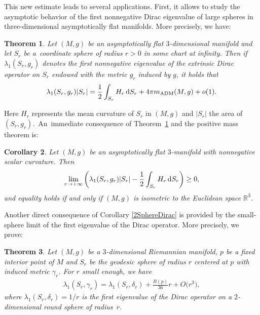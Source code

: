 \documentclass[pdftex]{sigma}
\numberwithin{equation}{section}
\newtheorem{Theorem}{Theorem}[section]
\newtheorem{Corollary}[Theorem]{Corollary}
\begin{document}
This new estimate leads to several applications. First, it allows to study the asymptotic behavior of the first nonnegative Dirac eigenvalue of large spheres in three-dimensional asymptotically flat manifolds. More precisely, we have:

\begin{Theorem}\label{AsymptoticDiracSphere}
Let $(M,g)$ be an asymptotically flat $3$-dimensional manifold and let $S_r$ be a~coordinate sphere of radius $r>0$ in some chart at infinity. Then if $\lambda_1(S_r,g_r)$ denotes the first nonnegative eigenvalue of the extrinsic Dirac operator on $S_r$ endowed with the metric $g_r$ induced by $g$, it holds that
\begin{gather}\label{IntegralInequality1}
\lambda_1(S_r,g_r)|S_r|=\frac{1}{2}\int_{S_r} H_r\,{\rm d}S_{r}+4\pi m_{\rm ADM}(M,g)+o(1).
\end{gather}
\end{Theorem}

Here $H_r$ represents the mean curvature of $S_r$ in $(M,g)$ and $|S_r|$ the area of $(S_r,g_r)$.\ An~im\-me\-di\-ate consequence of Theorem~\ref{AsymptoticDiracSphere} and the positive mass theorem is:

\begin{Corollary}%
Let $(M,g)$ be an asymptotically flat $3$-manifold with nonnegative scalar curvature. Then
\begin{gather*}
\lim_{r\rightarrow+\infty}\bigg(\lambda_1(S_r,g_r)|S_r|-\frac{1}{2}\int_{S_r} H_r\,{\rm d}S_{r}\bigg)\geq 0,
\end{gather*}
and equality holds if and only if $(M,g)$ is isometric to the Euclidean space $\mathbb{R}^3$.
\end{Corollary}

Another direct consequence of Corollary \ref{2SphereDirac} is provided by the small-sphere limit of the first eigenvalue of the Dirac operator. More precisely, we prove:

\begin{Theorem}\label{SmallSphereExpansion}
Let $(M,g)$ be a $3$-dimensional Riemannian manifold, $p$ be a fixed interior point of $M$ and $S_r$ be the geodesic sphere of radius $r$ centered at $p$ with induced metric $\gamma_r$. For $r$ small enough, we have
\begin{gather*}%
\lambda_1(S_r,\gamma_r)=\lambda_1(S_r,\delta_r)+\frac{R(p)}{36}r+O\big(r^3\big),
\end{gather*}
where $\lambda_1(S_r,\delta_r)=1/r$ is the first eigenvalue of the Dirac operator on a $2$-dimensional round sphere of radius~$r$.
\end{Theorem}
\end{document}
